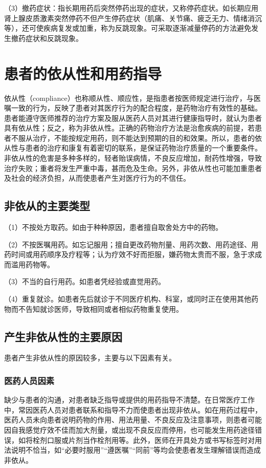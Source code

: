 （3）撤药症状：指长期用药后突然停药出现的症状，又称停药症状。如长期应用肾上腺皮质激素突然停药不但产生停药症状（肌痛、关节痛、疲乏无力、情绪消沉等），还可使疾病复发或加重，称为反跳现象。可采取逐渐减量停药的方法避免发生撤药症状和反跳现象。

\section{患者的依从性和用药指导}

依从性（compliance）也称顺从性、顺应性，是指患者按医师规定进行治疗，与医嘱一致的行为，反映了患者对其医疗行为的配合程度，是药物治疗有效性的基础。患者能遵守医师推荐的治疗方案及服从医药人员对其进行健康指导时，就认为患者具有依从性；反之，称为非依从性。正确的药物治疗方法是治愈疾病的前提，若患者不服从治疗，不能按规定用药，则不能达到预期的目的和效果。所以，患者的依从性与患者的治疗和康复有着密切的联系，是保证药物治疗质量的一个重要条件。非依从性的危害是多种多样的，轻者贻误病情，不良反应增加，耐药性增强，导致治疗失败；重者将发生严重中毒，甚而危及生命。另外，非依从性也可能加重患者及社会的经济负担，从而使患者产生对医疗行为的不信任。

\subsection{非依从的主要类型}

（1）不按处方取药。如由于种种原因，患者擅自取舍处方中的药物。

（2）不按医嘱用药。如忘记服用；擅自更改药物剂量、用药次数、用药途径、用药时间或用药顺序及疗程等；认为疗效不好而拒服，嫌药物太贵而不服，急于求成而滥用药物等。

（3）不当的自行用药。如患者凭经验或直觉用药。

（4）重复就诊。如患者先后就诊于不同医疗机构、科室，或同时正在使用其他药物而不告知就诊医师，导致相同或者相似药物重复使用。

\subsection{产生非依从性的主要原因}

患者产生非依从性的原因较多，主要与以下因素有关。

\subsubsection{医药人员因素}

缺少与患者的沟通，对患者缺乏指导或提供的用药指导不清楚。在日常医疗工作中，常因医药人员对患者联系和指导不力而使患者出现非依从。如在用药过程中，医药人员未向患者说明药物的作用、用法用量、不良反应及注意事项，则患者可能因自我感觉疗效不佳而加大剂量，或出现不良反应而停用，也可能发生用药途径错误，如将栓剂口服或片剂当作栓剂用等。此外，医师在开具处方或书写标签时对用法说明不恰当，如``必要时服用''``遵医嘱''``同前''等均会使患者发生理解错误而造成非依从。

